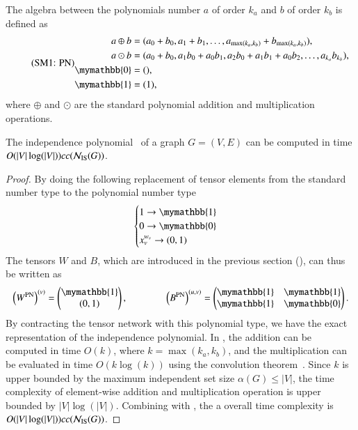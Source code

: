 \documentclass[review, onefignum, onetabnum]{siamart190516}
\begin{document}
The algebra between the polynomials number $a$ of order $k_a$ and $b$ of order $k_b$ is defined as
\begin{equation}
    \eqname{PN}
    \begin{split}
    a \oplus b &= (a_0 + b_0, a_1 + b_1, \ldots, a_{\max(k_a, k_b)} + b_{\max(k_a, k_b)}),\\
    a \odot b &= (a_0 + b_0, a_1b_0 + a_0b_1, a_{2}b_{0} + a_{1}b_{1} + a_{0}b_{2},  \ldots, a_{k_a} b_{k_b}),\\
    \mymathbb{0} &= (),  \\
    \mymathbb{1} &= (1), \label{eq:polynomial}
    \end{split}
\end{equation}
where $\oplus$ and $\odot$ are the standard polynomial addition and multiplication operations.

\begin{theorem}\label{thm:complexpoly}
    The independence polynomial~\cite{Harvey2018,Ferrin2014} of a graph $G = (V, E)$ can be computed in time $O(|V|\log(|V|))cc({\mathcal{N}_{\rm IS}(G)})$.
\end{theorem}
\begin{proof}
By doing the following replacement of tensor elements from the standard number type to the polynomial number type
\begin{equation}
    \begin{cases}
    1 \rightarrow \mymathbb{1}\\
    0 \rightarrow \mymathbb{0}\\
    x_v^{w_v} \rightarrow (0, 1)
    \end{cases}
\end{equation}
The tensors $W$ and $B$, which are introduced in the previous section (), can thus be written as 
\begin{equation}
    \left(W^{\rm PN}\right)^{(v)} = \left(\begin{matrix}
        \mymathbb{1} \\
        (0,1)
    \end{matrix}\right),   
    \qquad \qquad
        \left(B^{\rm PN}\right)^{(u, v)} = \left(\begin{matrix}
        \mymathbb{1}  & \mymathbb{1} \\
        \mymathbb{1} & \mymathbb{0}
    \end{matrix}\right).
\end{equation}
By contracting the tensor network with this polynomial type, we have the exact representation of the independence polynomial.
In , the addition can be computed in time $O(k)$, where $k=\max(k_a, k_b)$, and the multiplication can be evaluated in time $O(k\log(k))$ using the convolution theorem~\cite{Schonhage1971}.
Since $k$ is upper bounded by the maximum independent set size $\alpha(G) \leq |V|$, the time complexity of element-wise addition and multiplication operation is upper bounded by $|V|\log(|V|)$. Combining with , the a overall time complexity is $O(|V|\log(|V|))cc({\mathcal{N}_{\rm IS}(G)})$.
\end{proof}
\end{document}
